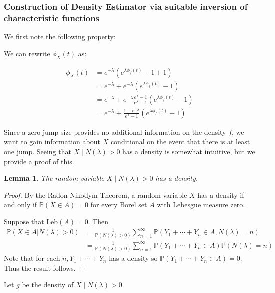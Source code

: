 \documentclass[a4paper,11pt]{article}
\theoremstyle{theorem}
\newtheorem{lem}{Lemma}[section]
\theoremstyle{definition}
\theoremstyle{remark}
\begin{document}
\subsubsection{Construction of Density Estimator via suitable inversion of characteristic functions}

We first note the following property:

We can rewrite $\phi_{X}(t)$ as:

\begin{align}
\phi_{X}(t) &= e^{-\lambda}(e^{\lambda \phi_{f}(t)} - 1 + 1) \nonumber \\
		    &= e^{-\lambda} + e^{-\lambda}(e^{\lambda \phi_{f}(t)} - 1) \nonumber \\
		    &= e^{-\lambda} + e^{-\lambda}\frac{e^{\lambda} - 1}{e^{\lambda} - 1}(e^{\lambda \phi_{f}(t)} - 1) \nonumber \\
		    &= e^{-\lambda} + \frac{1 - e^{-\lambda}}{e^{\lambda} - 1}(e^{\lambda \phi_{f}(t)} - 1) \label{eq:charX}
\end{align}

Since a zero jump size provides no additional information on the density $f$, we want to gain information about $X$ conditional on the event that there is at least one jump. Seeing that $X \;|\; N(\lambda) > 0$ has a density is somewhat intuitive, but we provide a proof of this.

\begin{lem}
The random variable $X \;|\; N(\lambda) > 0$ has a density.
\end{lem}
\begin{proof}
By the Radon-Nikodym Theorem, a random variable $X$ has a density if and only if $\mathbb{P}(X \in A) = 0$ for every Borel set $A$ with Lebesgue measure zero.

Suppose that Leb$(A) = 0$. Then
\begin{align*}
\mathbb{P}(X \in A | N(\lambda) > 0)
&= \frac{1}{\mathbb{P}(N(\lambda) > 0)}\sum_{n=1}^{\infty}{\mathbb{P}\left(Y_{1} + \dotsb + Y_{n} \in A, N(\lambda) = n\right)} \\
&= \frac{1}{\mathbb{P}(N(\lambda) > 0)}\sum_{n=1}^{\infty}{\mathbb{P}\left(Y_{1} + \dotsb + Y_{n} \in A\right) \mathbb{P}(N(\lambda) = n)}                                     
\end{align*}
Note that for each $n, Y_{1} + \dotsb + Y_{n}$ has a density so $\mathbb{P}\left(Y_{1} + \dotsb + Y_{n} \in A\right) = 0$. Thus the result follows.

\end{proof}
Let $g$ be the density of $X \;|\; N(\lambda) > 0$. 
\end{document}
